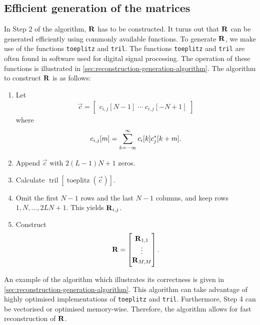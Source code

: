 \documentclass[a4paper, openany, oneside]{memoir}
\begin{document}
\subsection{Efficient generation of the matrices}
\label{sub:reconstruction-generation}
In Step 2 of the algorithm, $\boldsymbol{\mathbf{R}}$ has to be constructed. It turns out that $\boldsymbol{\mathbf{R}}$ can be generated efficiently using commonly available functions. To generate $\boldsymbol{\mathbf{R}}$, we make use of the functions \texttt{toeplitz} and \texttt{tril}. The functions \texttt{toeplitz} and \texttt{tril} are often found in software used for digital signal processing. The operation of these functions is illustrated in \cref{sec:reconstruction-generation-algorithm}. The algorithm to construct $\boldsymbol{\mathbf{R}}$ is as follows:

\begin{enumerate}[labelindent=0pt,labelwidth=\widthof{\ref{last-item2}},label=Step \arabic*:,itemindent=1em,leftmargin=!]
    \item Let \begin{align*}
                \vec{c} = \begin{bmatrix} c_{i,j}[N-1] \; \cdots \; c_{i,j}[-N+1] \end{bmatrix}
\end{align*} where \begin{align*}
                c_{i,j}[m] = \sum_{k=-\infty}^{\infty}c_i[k] c^*_j[k+m].
            \end{align*}
    \item Append $\vec{c}$ with $2(L-1)N+1$ zeros.
    \item Calculate $\operatorname{tril}[\operatorname{toeplitz}(\vec{c})]$.
    \item Omit the first $N-1$ rows and the last $N-1$ columns, and keep rows $1,N,\ldots,2LN+1$. This yields $\boldsymbol{\mathbf{R}}_{i,j}$.
    \item Construct \begin{align*}
        \boldsymbol{\mathbf{R}} = \begin{bmatrix}
            \boldsymbol{\mathbf{R}}_{1,1} \\ \vdots \\ \boldsymbol{\mathbf{R}}_{M,M}
        \end{bmatrix}.
    \end{align*}
    \label{last-item2}
\end{enumerate}

An example of the algorithm which illustrates its correctness is given in \cref{sec:reconstruction-generation-algorithm}. This algorithm can take advantage of highly optimised implementations of \texttt{toeplitz} and \texttt{tril}. Furthermore, Step 4 can be vectorised or optimised memory-wise. Therefore, the algorithm allows for fast reconstruction of $\boldsymbol{\mathbf{R}}$.
\end{document}
